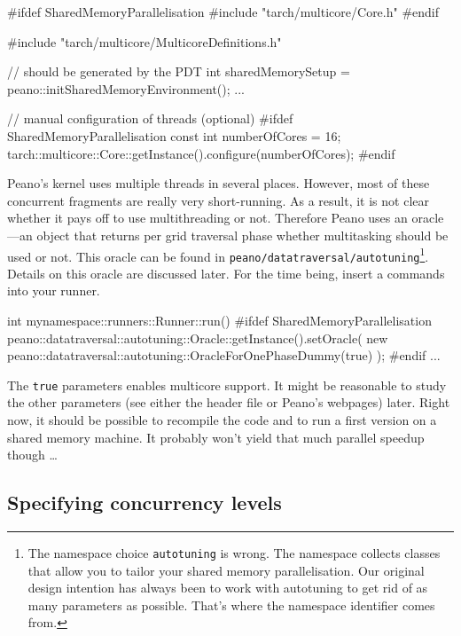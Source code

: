 \begin{code}
#ifdef SharedMemoryParallelisation
#include "tarch/multicore/Core.h"
#endif

#include "tarch/multicore/MulticoreDefinitions.h"

  // should be generated by the PDT
  int sharedMemorySetup = peano::initSharedMemoryEnvironment();
  ...


  // manual configuration of threads (optional)
  #ifdef SharedMemoryParallelisation
  const int         numberOfCores    = 16;
  tarch::multicore::Core::getInstance().configure(numberOfCores);
  #endif

\end{code}

\noindent
Peano's kernel uses multiple threads in several places. 
However, most of these concurrent fragments are really very short-running.
As a result, it is not clear whether it pays off to use multithreading or not.
Therefore Peano uses an oracle---an object that returns per grid
traversal phase whether multitasking should be used or not.
This oracle can be found in \linebreak
\texttt{peano/datatraversal/autotuning}\footnote{The namespace choice
\texttt{autotuning} is wrong. The namespace collects classes that allow you to
tailor your shared memory parallelisation. Our original design intention has
always been to work with autotuning to get rid of as many parameters as
possible. That's where the namespace identifier comes from.}.
Details on this oracle are discussed later.
For the time being, insert a commands into your runner.

\begin{code}
int mynamespace::runners::Runner::run() {
  #ifdef SharedMemoryParallelisation
  peano::datatraversal::autotuning::Oracle::getInstance().setOracle(
    new peano::datatraversal::autotuning::OracleForOnePhaseDummy(true)
  );
  #endif
  ...
}
\end{code}

\noindent
The \texttt{true} parameters enables multicore support.
It might be reasonable to study the other parameters (see either the header
file or Peano's webpages) later.
Right now, it should be possible to recompile the code and to run a first
version on a shared memory machine.
It probably won't yield that much parallel speedup though \ldots


\subsection{Specifying concurrency levels}

